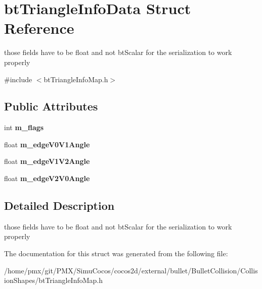 \hypertarget{structbtTriangleInfoData}{}\section{bt\+Triangle\+Info\+Data Struct Reference}
\label{structbtTriangleInfoData}


those fields have to be float and not bt\+Scalar for the serialization to work properly  




{\ttfamily \#include $<$bt\+Triangle\+Info\+Map.\+h$>$}

\subsection*{Public Attributes}
\begin{DoxyCompactItemize}
\item 
\mbox{\label{structbtTriangleInfoData_a7bfe20013f2997922e04767055b3fe6a}} 
int {\bfseries m\+\_\+flags}
\item 
\mbox{\label{structbtTriangleInfoData_a1cc8fe53a7be04e8020739dc8debd9b1}} 
float {\bfseries m\+\_\+edge\+V0\+V1\+Angle}
\item 
\mbox{\label{structbtTriangleInfoData_a12ce66d0be1997d05680f9e4625b6796}} 
float {\bfseries m\+\_\+edge\+V1\+V2\+Angle}
\item 
\mbox{\label{structbtTriangleInfoData_a54743fbdba0d972e9ab16f756236659f}} 
float {\bfseries m\+\_\+edge\+V2\+V0\+Angle}
\end{DoxyCompactItemize}


\subsection{Detailed Description}
those fields have to be float and not bt\+Scalar for the serialization to work properly 

The documentation for this struct was generated from the following file\+:\begin{DoxyCompactItemize}
\item 
/home/pmx/git/\+P\+M\+X/\+Simu\+Cocos/cocos2d/external/bullet/\+Bullet\+Collision/\+Collision\+Shapes/bt\+Triangle\+Info\+Map.\+h\end{DoxyCompactItemize}
